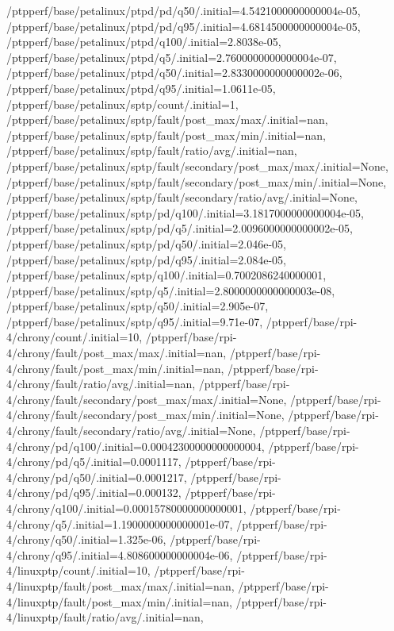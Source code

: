 {    /ptpperf/base/petalinux/ptpd/pd/q50/.initial=4.5421000000000004e-05,
    /ptpperf/base/petalinux/ptpd/pd/q95/.initial=4.6814500000000004e-05,
    /ptpperf/base/petalinux/ptpd/q100/.initial=2.8038e-05,
    /ptpperf/base/petalinux/ptpd/q5/.initial=2.7600000000000004e-07,
    /ptpperf/base/petalinux/ptpd/q50/.initial=2.8330000000000002e-06,
    /ptpperf/base/petalinux/ptpd/q95/.initial=1.0611e-05,
    /ptpperf/base/petalinux/sptp/count/.initial=1,
    /ptpperf/base/petalinux/sptp/fault/post_max/max/.initial=nan,
    /ptpperf/base/petalinux/sptp/fault/post_max/min/.initial=nan,
    /ptpperf/base/petalinux/sptp/fault/ratio/avg/.initial=nan,
    /ptpperf/base/petalinux/sptp/fault/secondary/post_max/max/.initial=None,
    /ptpperf/base/petalinux/sptp/fault/secondary/post_max/min/.initial=None,
    /ptpperf/base/petalinux/sptp/fault/secondary/ratio/avg/.initial=None,
    /ptpperf/base/petalinux/sptp/pd/q100/.initial=3.1817000000000004e-05,
    /ptpperf/base/petalinux/sptp/pd/q5/.initial=2.0096000000000002e-05,
    /ptpperf/base/petalinux/sptp/pd/q50/.initial=2.046e-05,
    /ptpperf/base/petalinux/sptp/pd/q95/.initial=2.084e-05,
    /ptpperf/base/petalinux/sptp/q100/.initial=0.7002086240000001,
    /ptpperf/base/petalinux/sptp/q5/.initial=2.8000000000000003e-08,
    /ptpperf/base/petalinux/sptp/q50/.initial=2.905e-07,
    /ptpperf/base/petalinux/sptp/q95/.initial=9.71e-07,
    /ptpperf/base/rpi-4/chrony/count/.initial=10,
    /ptpperf/base/rpi-4/chrony/fault/post_max/max/.initial=nan,
    /ptpperf/base/rpi-4/chrony/fault/post_max/min/.initial=nan,
    /ptpperf/base/rpi-4/chrony/fault/ratio/avg/.initial=nan,
    /ptpperf/base/rpi-4/chrony/fault/secondary/post_max/max/.initial=None,
    /ptpperf/base/rpi-4/chrony/fault/secondary/post_max/min/.initial=None,
    /ptpperf/base/rpi-4/chrony/fault/secondary/ratio/avg/.initial=None,
    /ptpperf/base/rpi-4/chrony/pd/q100/.initial=0.00042300000000000004,
    /ptpperf/base/rpi-4/chrony/pd/q5/.initial=0.0001117,
    /ptpperf/base/rpi-4/chrony/pd/q50/.initial=0.0001217,
    /ptpperf/base/rpi-4/chrony/pd/q95/.initial=0.000132,
    /ptpperf/base/rpi-4/chrony/q100/.initial=0.00015780000000000001,
    /ptpperf/base/rpi-4/chrony/q5/.initial=1.1900000000000001e-07,
    /ptpperf/base/rpi-4/chrony/q50/.initial=1.325e-06,
    /ptpperf/base/rpi-4/chrony/q95/.initial=4.808600000000004e-06,
    /ptpperf/base/rpi-4/linuxptp/count/.initial=10,
    /ptpperf/base/rpi-4/linuxptp/fault/post_max/max/.initial=nan,
    /ptpperf/base/rpi-4/linuxptp/fault/post_max/min/.initial=nan,
    /ptpperf/base/rpi-4/linuxptp/fault/ratio/avg/.initial=nan,
}
